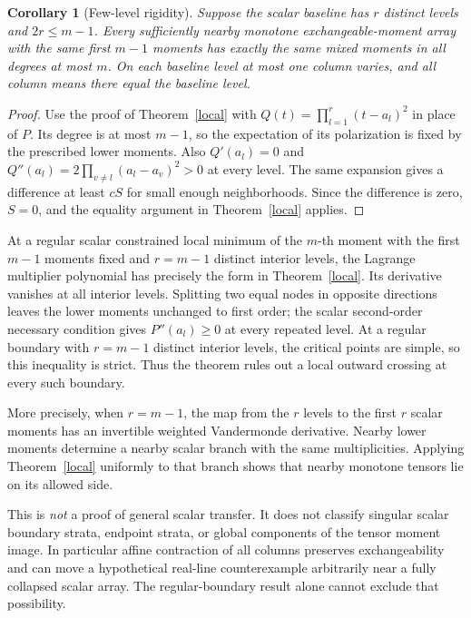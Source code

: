 \documentclass[11pt]{article}
\newtheorem{corollary}{Corollary}
\begin{document}
\begin{corollary}[Few-level rigidity]
Suppose the scalar baseline has $r$ distinct levels and $2r\le m-1$.
Every sufficiently nearby monotone exchangeable-moment array with the
same first $m-1$ moments has exactly the same mixed moments in all
degrees at most $m$. On each baseline level at most one column varies,
and all column means there equal the baseline level.
\end{corollary}
\begin{proof}
Use the proof of Theorem~\ref{local} with
$Q(t)=\prod_{l=1}^r(t-a_l)^2$ in place of $P$. Its degree is at most
$m-1$, so the expectation of its polarization is fixed by the prescribed
lower moments. Also $Q'(a_l)=0$ and
$Q''(a_l)=2\prod_{v\ne l}(a_l-a_v)^2>0$ at every level.
The same expansion gives a difference at least $cS$ for small enough
neighborhoods. Since the difference is zero, $S=0$, and the equality
argument in Theorem~\ref{local} applies.
\end{proof}

At a regular scalar constrained local minimum of the $m$-th
moment with the first $m-1$ moments fixed and $r=m-1$ distinct
interior levels, the Lagrange multiplier polynomial has precisely the
form in Theorem~\ref{local}.
Its derivative vanishes at all interior levels. Splitting two equal
nodes in opposite directions leaves the lower moments unchanged to
first order; the scalar second-order necessary condition gives
$P''(a_l)\ge0$ at every repeated level. At a regular boundary with
$r=m-1$ distinct interior levels, the critical points are simple, so
this inequality is strict. Thus the theorem rules out a local
outward crossing at every such boundary.

More precisely, when $r=m-1$, the map from the $r$ levels to the first
$r$ scalar moments has an invertible weighted Vandermonde derivative.
Nearby lower moments determine a nearby scalar branch with the same
multiplicities. Applying Theorem~\ref{local} uniformly to that branch
shows that nearby monotone tensors lie on its allowed side.

This is \emph{not} a proof of general scalar transfer. It does not
classify singular scalar boundary strata, endpoint strata, or global
components of the tensor moment image. In particular affine contraction
of all columns preserves exchangeability and can move a hypothetical
real-line counterexample arbitrarily near a fully collapsed scalar
array. The regular-boundary result alone cannot exclude that possibility.
\end{document}
